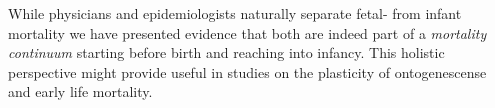 \documentclass[12pt, parskip=half]{scrartcl}
\begin{document}
While physicians and epidemiologists naturally separate fetal- from infant mortality we have presented evidence that both are indeed part of a \emph{mortality continuum} starting before birth and reaching into infancy. This holistic perspective might provide useful in studies on the plasticity of ontogenescense and early life mortality.

\clearpage


\sloppy
\printbibliography




\end{document}
